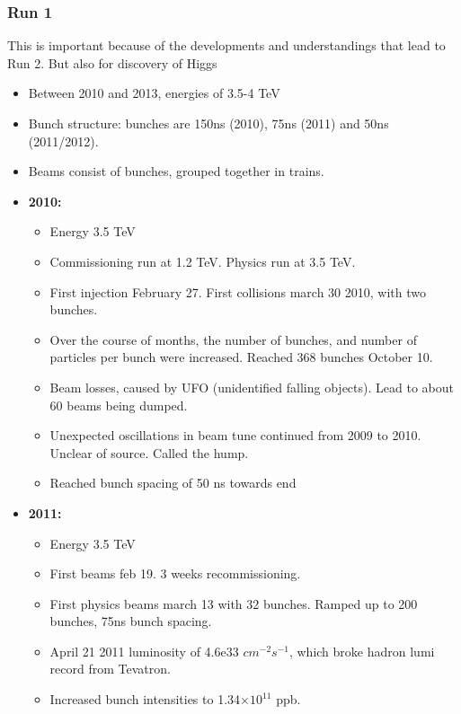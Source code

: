 \subsubsection{Run 1}
This is important because of the developments and understandings that lead to Run 2. But also for discovery of Higgs
\begin{itemize}
    \item Between 2010 and 2013, energies of 3.5-4 TeV \cite{lhcRun1}
    \item Bunch structure: bunches are 150ns (2010), 75ns (2011) and 50ns (2011/2012). \cite{lhcRun1}
    \item Beams consist of bunches, grouped together in trains. \cite{lhcRun1}
    \item \textbf{2010:} \cite{lhcRun1}
    \begin{itemize}
        \item Energy 3.5 TeV \cite{lhcRun1}
        \item Commissioning run at 1.2 TeV. Physics run at 3.5 TeV. \cite{lhcRun1}
        \item First injection February 27. First collisions march 30 2010, with two bunches. \cite{lhcRun1}
        \item Over the course of months, the number of bunches, and number of particles per bunch were increased. Reached 368 bunches October 10. \cite{lhcRun1}
        \item Beam losses, caused by UFO (unidentified falling objects).  Lead to about 60 beams being dumped. \cite{lhcRun1}
        \item Unexpected oscillations in beam tune continued from 2009 to 2010. Unclear of source. Called the hump. \cite{lhcRun1}
        \item Reached bunch spacing of 50 ns towards end \cite{lhcRun1}
    \end{itemize}
    \item \textbf{2011:} \cite{lhcRun1}
    \begin{itemize}
        \item Energy 3.5 TeV \cite{lhcRun1}
        \item First beams feb 19. 3 weeks recommissioning. \cite{lhcRun1}
        \item First physics beams march 13 with 32 bunches. Ramped up to 200 bunches, 75ns bunch spacing. \cite{lhcRun1}
        \item April 21 2011 luminosity of 4.6e33 $cm^{-2}s^{-1}$, which broke hadron lumi record from Tevatron. \cite{lhcRun1}
        \item Increased bunch intensities to 1.34$\times10^{11}$ ppb. \cite{lhcRun1}

\end{itemize}
\end{itemize}
